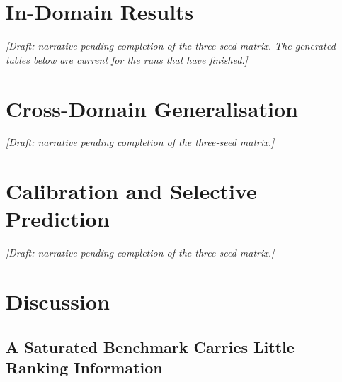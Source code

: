 \documentclass[runningheads]{llncs}
\begin{document}
\section{In-Domain Results}
\label{sec:indomain}

\noindent\emph{[Draft: narrative pending completion of the three-seed matrix.
The generated tables below are current for the runs that have finished.]}



\section{Cross-Domain Generalisation}
\label{sec:xdomain}

\noindent\emph{[Draft: narrative pending completion of the three-seed matrix.]}




\section{Calibration and Selective Prediction}
\label{sec:calibration}

\noindent\emph{[Draft: narrative pending completion of the three-seed matrix.]}



\section{Discussion}

\subsection{A Saturated Benchmark Carries Little Ranking Information}
\end{document}
